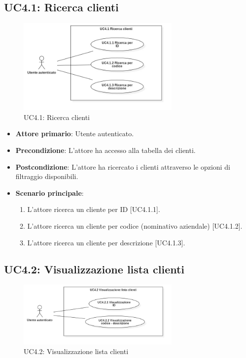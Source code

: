 \pagebreak

\subsection{UC4.1: Ricerca clienti}
\begin{figure}[!h]
\centering
\includegraphics[width=300px]{../images/UC/.jpeg/UC4.1-ricercaCliente.jpg}
\caption{UC4.1: Ricerca clienti}
\end{figure}

\begin{itemize}
\item \textbf{Attore primario}: Utente autenticato.
\item \textbf{Precondizione}: L'attore ha accesso alla tabella dei clienti.
\item \textbf{Postcondizione}: L'attore ha ricercato i clienti attraverso le opzioni di filtraggio disponibili.
\item \textbf{Scenario principale}: 
\begin{enumerate}
\item L'attore ricerca un cliente per ID [UC4.1.1].
\item L'attore ricerca un cliente per codice (nominativo aziendale) [UC4.1.2].
\item L'attore ricerca un cliente per descrizione [UC4.1.3].
\end{enumerate}
\end{itemize}

\pagebreak

\subsection{UC4.2: Visualizzazione lista clienti}
\begin{figure}[!h]
\centering
\includegraphics[width=300px]{../images/UC/.jpeg/UC4.2-visualizzazioneListaClienti.jpg}
\caption{UC4.2: Visualizzazione lista clienti}
\end{figure}

